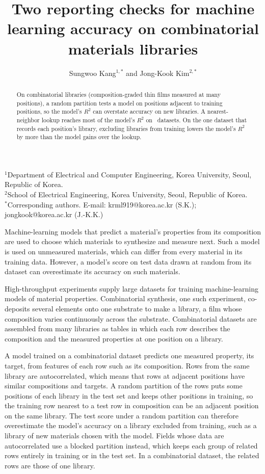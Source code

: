 \documentclass[11pt]{article}
\title{Two reporting checks for machine learning accuracy on combinatorial
materials libraries}
\author{Sungwoo Kang$^{1,\ast}$ and Jong-Kook Kim$^{2,\ast}$}
\date{}
\begin{document}
\maketitle

\noindent$^{1}$Department of Electrical and Computer Engineering, Korea
University, Seoul, Republic of Korea.\\
$^{2}$School of Electrical Engineering, Korea University, Seoul, Republic of
Korea.\\
$^{\ast}$Corresponding authors. E-mail: krml919@korea.ac.kr (S.K.);
jongkook@korea.ac.kr (J.-K.K.)

\begin{abstract}
\noindent On combinatorial libraries (composition-graded thin films measured at
many positions), a random partition tests a model on positions adjacent to
training positions, so the model's $R^2$ can overstate accuracy on new
libraries. A nearest-neighbor lookup reaches most of the model's $R^2$ on
\libraryDatasets\ datasets. On the one dataset that records each position's
library, excluding libraries from training lowers the model's $R^2$ by more than
the model gains over the lookup.
\end{abstract}

\label{par:intro}
Machine-learning models that predict a material's properties from its
composition are used to choose which materials to synthesize and measure
next.\cite{meredig2018extrapolation,thelen2025electrocatalyst} Such a model is
used on unmeasured materials, which can differ from every material in its
training data. However, a model's score on test data drawn at
random from its dataset can overestimate its accuracy on such
materials.\cite{meredig2018extrapolation}

High-throughput experiments supply large datasets for training machine-learning
models of material properties.\cite{green2013combinatorial,zakutayev2018htem}
Combinatorial synthesis, one such experiment, co-deposits several elements
onto one substrate to make a library, a film whose composition varies
continuously across the substrate.\cite{green2013combinatorial}
Combinatorial datasets are assembled from many libraries as tables in which
each row describes the composition and the measured properties at one position
on a library.

A model trained on a combinatorial dataset predicts one measured property, its
target, from features of each row such as its composition. Rows from
the same library are autocorrelated, which means that rows at adjacent
positions have similar compositions and targets. A random partition of
the rows puts some positions of each library in the test set and keeps other
positions in training, so the training row nearest to a test row in
composition can be an adjacent position on the same library. The test score
under a random partition can therefore overestimate the model's accuracy on a
library excluded from training, such as a library of new materials chosen with
the model. Fields whose data are autocorrelated use a blocked
partition instead, which keeps each group of related rows entirely in training
or in the test
set.\cite{roberts2017crossvalidation,wu2018moleculenet,meredig2018extrapolation}
In a combinatorial dataset, the related rows are those of one library.
\end{document}
